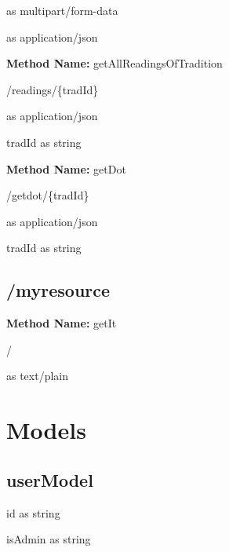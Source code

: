 \begin{request}
 as multipart/form-data
\end{request}
\begin{response}
 as application/json
\end{response}
\textbf{Method Name: }getAllReadingsOfTradition
\begin{get}
/readings/\{tradId\}
\end{get}
\begin{response}
 as application/json
\end{response}
\begin{parameter}
tradId as string
\end{parameter}
\textbf{Method Name: }getDot
\begin{get}
/getdot/\{tradId\}
\end{get}
\begin{response}
 as application/json
\end{response}
\begin{parameter}
tradId as string
\end{parameter}
\section{/myresource}
\textbf{Method Name: }getIt
\begin{get}
/
\end{get}
\begin{response}
 as text/plain
\end{response}
\chapter{Models}
\section{userModel}
\begin{property}
id as string
\end{property}
\begin{property}
isAdmin as string
\end{property}
